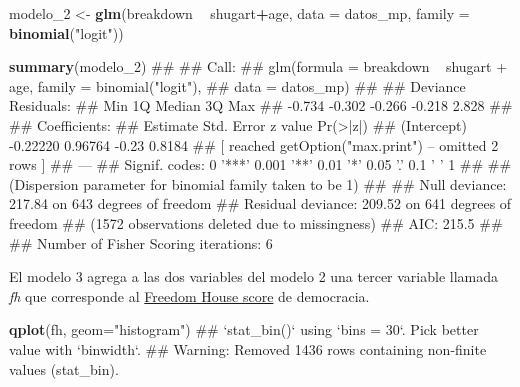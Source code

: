 \documentclass[]{book}
\newenvironment{Shaded}{\begin{snugshade}}{\end{snugshade}}
\newcommand{\KeywordTok}[1]{\textcolor[rgb]{0.13,0.29,0.53}{\textbf{#1}}}
\newcommand{\DataTypeTok}[1]{\textcolor[rgb]{0.13,0.29,0.53}{#1}}
\newcommand{\DecValTok}[1]{\textcolor[rgb]{0.00,0.00,0.81}{#1}}
\newcommand{\StringTok}[1]{\textcolor[rgb]{0.31,0.60,0.02}{#1}}
\newcommand{\OperatorTok}[1]{\textcolor[rgb]{0.81,0.36,0.00}{\textbf{#1}}}
\newcommand{\NormalTok}[1]{#1}
\begin{document}
\begin{Shaded}
\begin{Highlighting}[]
\NormalTok{modelo_}\DecValTok{2}\NormalTok{ <-}\StringTok{ }\KeywordTok{glm}\NormalTok{(breakdown }\OperatorTok{~}\StringTok{ }\NormalTok{shugart}\OperatorTok{+}\NormalTok{age, }
                \DataTypeTok{data   =}\NormalTok{ datos_mp,}
                \DataTypeTok{family =} \KeywordTok{binomial}\NormalTok{(}\StringTok{"logit"}\NormalTok{))}
\end{Highlighting}
\end{Shaded}

\begin{Shaded}
\begin{Highlighting}[]
\KeywordTok{summary}\NormalTok{(modelo_}\DecValTok{2}\NormalTok{)}
\NormalTok{## }
\NormalTok{## Call:}
\NormalTok{## glm(formula = breakdown ~ shugart + age, family = binomial("logit"), }
\NormalTok{##     data = datos_mp)}
\NormalTok{## }
\NormalTok{## Deviance Residuals: }
\NormalTok{##    Min      1Q  Median      3Q     Max  }
\NormalTok{## -0.734  -0.302  -0.266  -0.218   2.828  }
\NormalTok{## }
\NormalTok{## Coefficients:}
\NormalTok{##             Estimate Std. Error z value Pr(>|z|)   }
\NormalTok{## (Intercept) -0.22220    0.96764   -0.23   0.8184   }
\NormalTok{##  [ reached getOption("max.print") -- omitted 2 rows ]}
\NormalTok{## ---}
\NormalTok{## Signif. codes:  0 '***' 0.001 '**' 0.01 '*' 0.05 '.' 0.1 ' ' 1}
\NormalTok{## }
\NormalTok{## (Dispersion parameter for binomial family taken to be 1)}
\NormalTok{## }
\NormalTok{##     Null deviance: 217.84  on 643  degrees of freedom}
\NormalTok{## Residual deviance: 209.52  on 641  degrees of freedom}
\NormalTok{##   (1572 observations deleted due to missingness)}
\NormalTok{## AIC: 215.5}
\NormalTok{## }
\NormalTok{## Number of Fisher Scoring iterations: 6}
\end{Highlighting}
\end{Shaded}

El modelo 3 agrega a las dos variables del modelo 2 una tercer variable
llamada \emph{fh} que corresponde al
\href{https://freedomhouse.org/report/methodology-freedom-world-2017}{Freedom
House score} de democracia.

\begin{Shaded}
\begin{Highlighting}[]
\KeywordTok{qplot}\NormalTok{(fh, }\DataTypeTok{geom=}\StringTok{"histogram"}\NormalTok{) }
\NormalTok{## `stat_bin()` using `bins = 30`. Pick better value with `binwidth`.}
\NormalTok{## Warning: Removed 1436 rows containing non-finite values (stat_bin).}
\end{Highlighting}
\end{Shaded}
\end{document}
